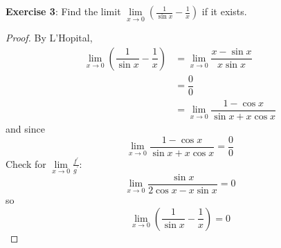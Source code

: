 \documentclass{article}
\begin{document}
\textbf{Exercise 3}: Find the limit $\lim\limits_{x \to 0}(\frac{1}{\sin{x}} - \frac{1}{x})$ if it exists.
    \begin{proof}
        By L'Hopital,
            \begin{align*}
                \lim\limits_{x \to 0}\left(\dfrac{1}{\sin{x}} - \dfrac{1}{x}\right) &= \lim\limits_{x \to 0}\dfrac{x - \sin{x}}{x\sin{x}}           \\
                                                                                    &= \dfrac{0}{0}                                                 \\
                                                                                    &= \lim\limits_{x \to 0}\dfrac{1 - \cos{x}}{\sin{x} + x\cos{x}}   
            \end{align*}
        and since
            \begin{equation*}
                \lim\limits_{x \to 0}\dfrac{1 - \cos{x}}{\sin{x} + x\cos{x}} = \dfrac{0}{0}
            \end{equation*}
        Check for $\lim\limits_{x \to 0}\frac{f^{\prime}}{g^{\prime}}$:
            \begin{equation*}
                \lim\limits_{x \to 0}\dfrac{\sin{x}}{2\cos{x} - x\sin{x}} = 0
            \end{equation*}
        so 
            \begin{equation*}
                \lim\limits_{x \to 0}\left(\dfrac{1}{\sin{x}} - \dfrac{1}{x}\right) = 0
            \end{equation*}
    \end{proof}
\end{document}
